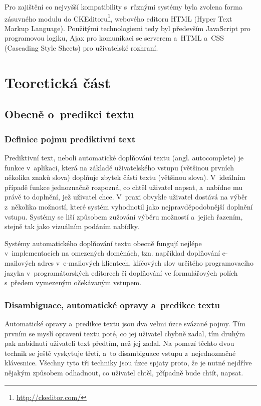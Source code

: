 \documentclass[a4paper,11pt,openany]{book} %
\begin{document}
Pro zajištění co nejvyšší kompatibility s~různými systémy byla zvolena forma zásuvného modulu do CKEditoru\footnote{\url{http://ckeditor.com/}}, webového editoru HTML (Hyper Text Markup Language). Použitými technologiemi tedy byl především JavaScript pro programovou logiku, Ajax pro komunikaci se serverem a~HTML a~CSS (Cascading Style Sheets) pro uživatelské rozhraní.

\part{Teoretická část}
\pagestyle{sensible}

\chapter{Obecně o~predikci textu}

\section{Definice pojmu prediktivní text}

Prediktivní text, neboli automatické doplňování textu (angl. autocomplete) je funkce v~aplikaci, která na základě uživatelského vstupu (většinou prvních několika znaků slova) doplňuje zbytek části textu (většinou slova). V~ideálním případě funkce jednoznačně rozpozná, co chtěl uživatel napsat, a~nabídne mu právě to doplnění, jež uživatel chce. V~praxi obvykle uživatel dostává na výběr z~několika možností, které systém vyhodnotil jako nejpravděpodobnější doplnění vstupu. Systémy se liší způsobem zužování výběru možností a~jejich řazením, stejně tak jako vizuálním podáním nabídky.

Systémy automatického doplňování textu obecně fungují nejlépe v~implementacích na omezených doménách, tzn. například doplňování e-mailových adres v~e-mailových klientech, klíčových slov určitého programovacího jazyka v~programátorských editorech či doplňování ve formulářových polích s~předem vymezeným očekávaným vstupem. 

\section{Disambiguace, automatické opravy a~predikce textu}

Automatické opravy a~predikce textu jsou dva velmi úzce svázané pojmy. Tím prvním se myslí opravení textu poté, co jej uživatel chybně zadal, tím druhým pak nabídnutí uživateli text předtím, než jej zadal. Na pomezí těchto dvou technik se ještě vyskytuje třetí, a~to disambiguace vstupu z~nejednoznačné klávesnice. Všechny tyto tři techniky jsou úzce spjaty proto, že je nutné nejdříve nějakým způsobem odhadnout, co uživatel chtěl, případně bude chtít, napsat.
\end{document}
